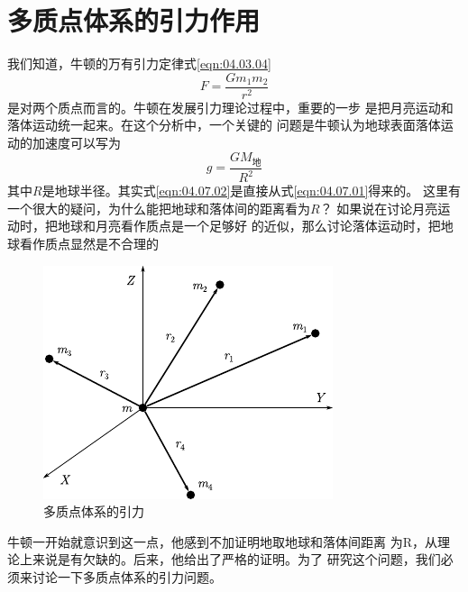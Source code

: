 \section{多质点体系的引力作用}\label{sec:04.07}

我们知道，牛顿的万有引力定律式\eqref{eqn:04.03.04}
\begin{equation}\label{eqn:04.07.01}
	F = \frac { G m _ { 1 } m _ { 2 } } { r ^ { 2 } }
\end{equation}
是对两个质点而言的。牛顿在发展引力理论过程中，重要的一步
是把月亮运动和落体运动统一起来。在这个分析中，一个关键的
问题是牛顿认为地球表面落体运动的加速度可以写为
\begin{equation}\label{eqn:04.07.02}
	g = \frac { G M _ \text{地} } { R ^ { 2 } }
\end{equation}
其中$ R $是地球半径。其实式\eqref{eqn:04.07.02}是直接从式\eqref{eqn:04.07.01}得来的。
这里有一个很大的疑问，为什么能把地球和落体间的距离看为$ R $？
如果说在讨论月亮运动时，把地球和月亮看作质点是一个足够好
的近似，那么讨论落体运动时，把地球看作质点显然是不合理的
\begin{figure}
	\centering
	\includegraphics{figure/fig04.09}
	\caption{多质点体系的引力}
	\label{fig:04.09}
\end{figure}
牛顿一开始就意识到这一点，他感到不加证明地取地球和落体间距离
为R，从理论上来说是有欠缺的。后来，他给出了严格的证明。为了
研究这个问题，我们必须来讨论一下多质点体系的引力问题。

